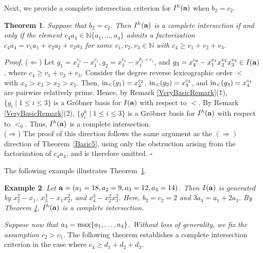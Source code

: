 \documentclass[10pt]{amsart}
\newtheorem{thm1}{Theorem}[section]
\newtheorem{ex1}[thm1]{Example}
\begin{document}
Next, we provide a complete intersection criterion for $I^{h}({\bf a})$ when $b_2=c_2$.

\begin{thm1} \label{Basic23} Suppose that $b_2=c_2$. Then $I^{h}({\bf a})$ is a complete intersection if and only if the element $c_{4}a_{4} \in \mathbb{N}\{a_1,\ldots,a_4\}$ admits a factorization $c_{4}a_{4}=v_{1}a_{1}+v_{2}a_{2}+v_{3}a_{3}$ for some $v_1, v_2, v_3 \in \mathbb{N}$ with $c_{4} \geq v_1+v_{2}+v_{3}$. 
\end{thm1}


{\em \noindent Proof.} ($\Leftarrow$) Let $g_{1}=x_{2}^{c_2}-x_{1}^{c_1}, g_{2}=x_{3}^{c_3}-x_{1}^{b_1+c_1}$, and $g_{3}=x_{4}^{c_4}-x_{1}^{v_1}x_{2}^{v_2}x_{3}^{v_3} \in I({\bf a})$, where $c_{4} \geq v_1+v_{2}+v_{3}$. Consider the degree reverse lexicographic order $<$ with $x_{4}>x_{3}>x_{2}>x_{1}$. Then, ${\rm in}_{<}(g_1)=x_{2}^{c_2}$, ${\rm in}_{<}(g_2)=x_{3}^{c_3}$, and ${\rm in}_{<}(g_3)=x_{4}^{c_4}$ are pairwise relatively prime. Hence, by Remark \ref{VeryBasicRemark}(1), $\{g_{i} \mid 1 \leq i \leq 3\}$ is a Gr\"obner basis for $I({\bf a})$ with respect to $<$. By Remark \ref{VeryBasicRemark}(2), $\{g_{i}^{h} \mid 1 \leq i \leq 3\}$ is a Gr\"obner basis for $I^{h}({\bf a})$ with respect to $<_{0}$. Thus, $I^{h}({\bf a})$ is a complete intersection.\\ ($\Rightarrow$) The proof of this direction follows the same argument as the $(\Rightarrow)$ direction of Theorem~\ref{Basic5}, using only the obstruction arising from the factorization of $c_4a_4$, and is therefore omitted. \hfill $\square$ \par\vspace{0.5\baselineskip}

The following example illustrates Theorem~\ref{Basic23}.


\begin{ex1} {\rm Let ${\bf a}=(a_{1}=18, a_{2}=9, a_{3}=12, a_{4}=14)$. Then $I({\bf a})$ is generated by $x_{2}^{2}-x_{1}$, $x_{3}^{3}-x_{1}x_{2}^{2}$, and $x_{4}^{3}-x_{2}^2x_{3}^{2}$. Here, $b_{2}=c_{2}=2$ and $3a_4=a_1+2a_3$. By Theorem \ref{Basic23}, $I^{h}({\bf a})$ is a complete intersection.} 
\end{ex1}

{\em Suppose now that $a_{3}={\rm max}\{a_1,\ldots,a_4\}$. Without loss of generality, we fix the assumption $c_{2}>c_{1}$.} The following theorem establishes a complete intersection criterion in the case where $c_4 \geq d_1+d_2+d_3$.
\end{document}
